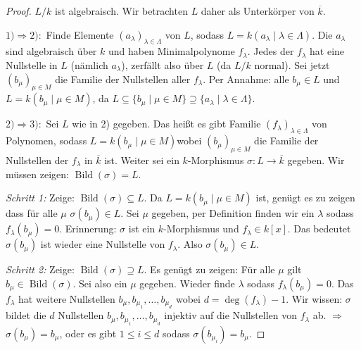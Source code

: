 \documentclass[a4paper,12pt,numbers=noenddot,parskip=full]{scrartcl}
\newcommand{\heading}{\underline}
\theoremstyle{dotless}
\theoremstyle{remark}
\begin{document}
	\begin{proof}
		$L/k$ ist algebraisch. Wir betrachten $L$ daher als Unterkörper von $\overline{k}$.
		
		\heading{$1) \Rightarrow 2):$} Finde Elemente $(a_\lambda)_{\lambda \in \Lambda}$ von $L$, sodass $L = k(a_\lambda \mid \lambda \in \Lambda)$. Die $a_\lambda$ sind algebraisch über $k$ und haben Minimalpolynome $f_\lambda$. Jedes der $f_\lambda$ hat eine Nullstelle in $L$ (nämlich $a_\lambda$), zerfällt also über $L$ (da $L/k$ normal). Sei jetzt $(b_\mu)_{\mu \in M}$ die Familie der Nullstellen aller $f_\lambda$. Per Annahme: alle $b_\mu \in L$ und $L = k(b_\mu \mid \mu \in M)$, da $L \subseteq \{ b_\mu \mid \mu \in M \} \supseteq \{ a_\lambda \mid \lambda \in \Lambda \}$.
		
		\heading{$2) \Rightarrow 3):$} Sei $L$ wie in 2) gegeben. Das heißt es gibt Familie $(f_\lambda)_{\lambda \in \Lambda}$ von Polynomen, sodass $L = k(b_\mu \mid \mu \in M)$wobei $(b_\mu)_{\mu \in M}$ die Familie der Nullstellen der $f_\lambda$ in $\overline{k}$ ist. Weiter sei ein $k$-Morphismus $\sigma: L \to \overline{k}$ gegeben. Wir müssen zeigen: $\operatorname{Bild}(\sigma) = L$.
		
		\textit{Schritt 1:} Zeige: $\operatorname{Bild}(\sigma) \subseteq L$. Da $L = k(b_\mu \mid \mu \in M)$ ist, genügt es zu zeigen dass für alle $\mu$ $\sigma(b_\mu) \in L$. Sei $\mu$ gegeben, per Definition finden wir ein $\lambda$ sodass $f_\lambda(b_\mu) = 0$. Erinnerung: $\sigma$ ist ein $k$-Morphismus und $f_\lambda \in k[x]$. Das bedeutet $\sigma(b_\mu)$ ist wieder eine Nullstelle von $f_\lambda$. Also $\sigma(b_\mu) \in L$.
		
		\textit{Schritt 2:} Zeige: $\operatorname{Bild}(\sigma) \supseteq L$. Es genügt zu zeigen: Für alle $\mu$ gilt $b_\mu \in \operatorname{Bild}(\sigma)$. Sei also ein $\mu$ gegeben. Wieder finde $\lambda$ sodass $f_\lambda(b_\mu) = 0$. Das $f_\lambda$ hat weitere Nullstellen $b_\mu, b_{\mu_1}, \dots, b_{\mu_d}$ wobei $d = \deg(f_\lambda) - 1$. Wir wissen: $\sigma$ bildet die $d$ Nullstellen $b_\mu, b_{\mu_1}, \dots, b_{\mu_d}$ injektiv auf die Nullstellen von $f_\lambda$ ab. $\Rightarrow$ $\sigma(b_\mu) = b_\mu$, oder es gibt $1 \leq i \leq d$ sodass $\sigma(b_{\mu_i}) = b_\mu$.
		

\end{proof}
\end{document}
